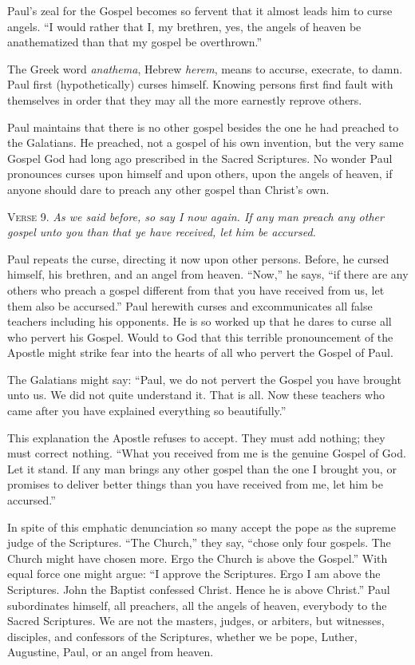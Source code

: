 Paul’s zeal for the Gospel becomes so fervent that it almost leads him to curse angels. “I would rather that I, my brethren, yes, the angels of heaven be anathematized than that my gospel be overthrown.”

The Greek word \emph{anathema}, Hebrew \emph{herem}, means to accurse, execrate, to damn. Paul first (hypothetically) curses himself. Knowing persons first find fault with themselves in order that they may all the more earnestly reprove others.

Paul maintains that there is no other gospel besides the one he had preached to the Galatians. He preached, not a gospel of his own invention, but the very same Gospel God had long ago prescribed in the Sacred Scriptures. No wonder Paul pronounces curses upon himself and upon others, upon the angels of heaven, if anyone should dare to preach any other gospel than Christ’s own.

\textsc{Verse} 9. \emph{As we said before, so say I now again. If any man preach any other gospel unto you than that ye have received, let him be accursed.}

Paul repeats the curse, directing it now upon other persons. Before, he cursed himself, his brethren, and an angel from heaven. “Now,” he says, “if there are any others who preach a gospel different from that you have received from us, let them also be accursed.” Paul herewith curses and excommunicates all false teachers including his opponents. He is so worked up that he dares to curse all who pervert his Gospel. Would to God that this terrible pronouncement of the Apostle might strike fear into the hearts of all who pervert the Gospel of Paul.

The Galatians might say: “Paul, we do not pervert the Gospel you have brought unto us. We did not quite understand it. That is all. Now these teachers who came after you have explained everything so beautifully.”

This explanation the Apostle refuses to accept. They must add nothing; they must correct nothing. “What you received from me is the genuine Gospel of God. Let it stand. If any man brings any other gospel than the one I brought you, or promises to deliver better things than you have received from me, let him be accursed.”

In spite of this emphatic denunciation so many accept the pope as the supreme judge of the Scriptures. “The Church,” they say, “chose only four gospels. The Church might have chosen more. Ergo the Church is above the Gospel.” With equal force one might argue: “I approve the Scriptures. Ergo I am above the Scriptures. John the Baptist confessed Christ. Hence he is above Christ.” Paul subordinates himself, all preachers, all the angels of heaven, everybody to the Sacred Scriptures. We are not the masters, judges, or arbiters, but witnesses, disciples, and confessors of the Scriptures, whether we be pope, Luther, Augustine, Paul, or an angel from heaven.

